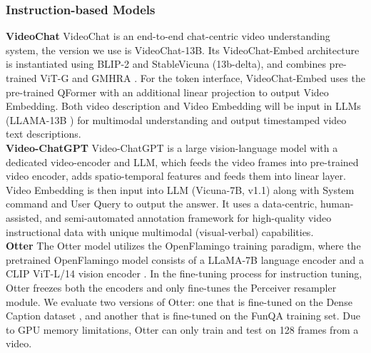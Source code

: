 \subsubsection{Instruction-based Models}
\noindent\textbf{VideoChat}\quad
VideoChat \cite{2023videochat} is an end-to-end chat-centric video understanding system, the version we use is VideoChat-13B. Its VideoChat-Embed architecture is instantiated using BLIP-2 \cite{li2023blip2} and StableVicuna (13b-delta), and combines pre-trained ViT-G \cite{sun2023evaclip} and GMHRA \cite{wang2022internvideo}. For the token interface, VideoChat-Embed uses the pre-trained QFormer with an additional linear projection to output Video Embedding. Both video description and Video Embedding will be input in LLMs (LLAMA-13B \cite{touvron2023llama}) for multimodal understanding and output timestamped video text descriptions. 
\\
\noindent\textbf{Video-ChatGPT}\quad 
Video-ChatGPT \cite{maaz2023videochatgpt} is a large vision-language model with a dedicated video-encoder and LLM, which feeds the video frames into pre-trained video encoder, adds spatio-temporal features and feeds them into linear layer. Video Embedding is then input into LLM (Vicuna-7B, v1.1) along with System command and User Query to output the answer. It uses a data-centric, human-assisted, and semi-automated annotation framework for high-quality video instructional data with unique multimodal (visual-verbal) capabilities.\\
\noindent\textbf{Otter}\quad 
The Otter model \cite{li2023otter} utilizes the OpenFlamingo training paradigm, where the pretrained OpenFlamingo model consists of a LLaMA-7B language encoder \cite{touvron2023llama} and a CLIP ViT-L/14 vision encoder \cite{radford2021learning}. In the fine-tuning process for instruction tuning, Otter freezes both the encoders and only fine-tunes the Perceiver resampler module. We evaluate two versions of Otter: one that is fine-tuned on the Dense Caption dataset \cite{krishna2017dense}, and another that is fine-tuned on the FunQA training set. Due to GPU memory limitations, Otter can only train and test on 128 frames from a video.



